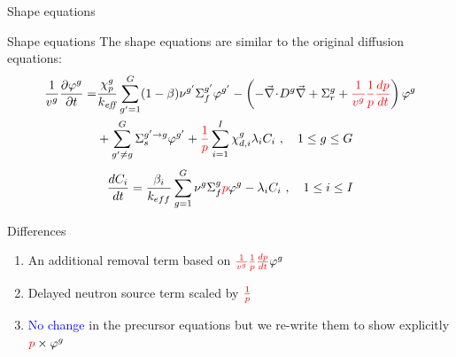 \documentclass[8pt]{beamer}
\renewcommand{\div}{\vec{\nabla}\! \cdot \!}
\newcommand{\grad}{\vec{\nabla}}
\newcommand{\be}{\begin{equation}}
\newcommand{\ee}{\end{equation}}
\newcommand{\ben}{\begin{enumerate}}
\newcommand{\een}{\end{enumerate}}
\newcommand{\keff}{\ensuremath{k_{\textit{eff}}}}
\newcommand{\tcr}[1]{\textcolor{red}{#1}}
\newcommand{\tcb}[1]{\textcolor{blue}{#1}}
\begin{document}
\begin{frame}{Shape equations}

\begin{block}{Shape equations}
The shape equations are similar to the original diffusion equations:
\begin{align}
\frac{1}{v^g} \frac{\partial \varphi^g }{\partial t} =& \frac{\chi_p^g}{\keff} \sum_{g'=1}^G (1-\beta) \nu^{g'} \Sigma_f^{g'} \varphi^{g'} -  \left( -\div D^g \grad  + \Sigma_r^g + \tcr{\frac{1}{v^g}\frac{1}{p}\frac{dp}{dt}}\right) \varphi^g  \nonumber \\
&  + \sum_{g'\neq g}^G\Sigma_s^{g'\to g} \varphi^{g'}  + \tcr{\frac{1}{p}}\sum_{i=1}^I\chi_{d,i}^g\lambda_i C_i \ , \quad 1 \le g \le G 
\label{eq:shape}
\end{align}
\be
\frac{dC_i}{dt} = \frac{\beta_i}{k_{eff}}\sum_{g=1}^G\nu^{g} \Sigma_f^g \tcr{p} \varphi^{g} - \lambda_i C_i \ , \quad 1 \le i \le I 
\ee
\end{block}

\begin{block}{Differences}
\ben
\item An additional removal term based on $\tcr{\frac{1}{v^g}\frac{1}{p}\frac{dp}{dt}} \varphi^g$
\item Delayed neutron source term scaled by $\tcr{\frac{1}{p}}$
\item \tcb{No change} in the precursor equations but we re-write them to show explicitly  $\tcr{p} \times \varphi^{g}$
\een
\end{block}

\end{frame}

\end{document}
